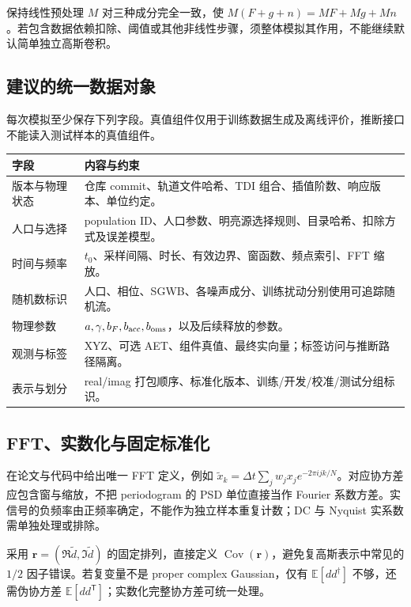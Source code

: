 \documentclass[UTF8,fontset=fandol,a4paper,11pt]{ctexart}
\numberwithin{equation}{section}
\newcommand{\E}{\mathbb E}
\newcommand{\Cov}{\operatorname{Cov}}
\newcommand{\br}{\boldsymbol r}
\begin{document}
保持线性预处理 $M$ 对三种成分完全一致，使 $M(F+g+n)=MF+Mg+Mn$。若包含数据依赖扣除、阈值或其他非线性步骤，须整体模拟其作用，不能继续默认简单独立高斯卷积。

\subsection{建议的统一数据对象}
每次模拟至少保存下列字段。真值组件仅用于训练数据生成及离线评价，推断接口不能读入测试样本的真值组件。
\par\noindent\begin{minipage}{\linewidth}\centering
\begin{tabular}{P{3.4cm}P{11.1cm}}
\toprule 字段 & 内容与约束\\\midrule
版本与物理状态 & 仓库 commit、轨道文件哈希、TDI 组合、插值阶数、响应版本、单位约定。\\
人口与选择 & population ID、人口参数、明亮源选择规则、目录哈希、扣除方式及误差模型。\\
时间与频率 & $t_0$、采样间隔、时长、有效边界、窗函数、频点索引、FFT 缩放。\\
随机数标识 & 人口、相位、SGWB、各噪声成分、训练扰动分别使用可追踪随机流。\\
物理参数 & $a,\gamma,b_F,b_{\rm acc},b_{\rm oms}$，以及后续释放的参数。\\
观测与标签 & XYZ、可选 AET、组件真值、最终实向量；标签访问与推断路径隔离。\\
表示与划分 & real/imag 打包顺序、标准化版本、训练/开发/校准/测试分组标识。\\\bottomrule
\end{tabular}
\end{minipage}\par\smallskip

\subsection{FFT、实数化与固定标准化}
在论文与代码中给出唯一 FFT 定义，例如 $\tilde x_k=\Delta t\sum_j w_jx_j e^{-2\pi i jk/N}$。对应协方差应包含窗与缩放，不把 periodogram 的 PSD 单位直接当作 Fourier 系数方差。实信号的负频率由正频率确定，不能作为独立样本重复计数；DC 与 Nyquist 实系数需单独处理或排除。

采用 $\br=(\Re\tilde d,\Im\tilde d)$ 的固定排列，直接定义 $\Cov(\br)$，避免复高斯表示中常见的 $1/2$ 因子错误。若复变量不是 proper complex Gaussian，仅有 $\E[dd^\dagger]$ 不够，还需伪协方差 $\E[dd^{\mathsf T}]$；实数化完整协方差可统一处理。
\end{document}
